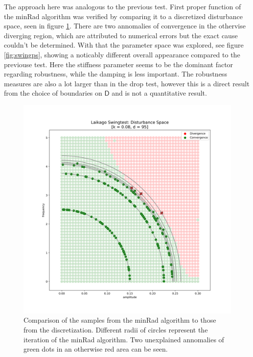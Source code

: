     The approach here was analogous to the previous test. First proper function of the minRad algorithm was verified by comparing it to a discretized disturbance space, seen in figure \ref{fig:swingoverlay}. There are two annomalies of convergence in the othervise diverging region, which are attributed to numerical errors but the exact cause couldn't be determined. With that the parameter space was explored, see figure \ref{fig:swingps}, showing a noticably different overall appearance compared to the previouse test. Here the stiffness parameter seems to be the dominant factor regarding robustness, while the damping is less important. The robustness measures are also a lot larger than in the drop test, however this is a direct result from the choice of boundaries on $\mathsf{D}$ and is not a quantitative result.   
    \begin{figure}[h]\label{fig:swingoverlay}
    \centering
    \includegraphics[width=.7\linewidth]{figures/swingtest_ds_overay_v3.png}
    \caption[Overlay of minRad and Discretized Disturbance Space, Swing Test]{Comparison of the samples from the minRad algorithm to those from the discretization. Different radii of circles represent the iteration of the minRad algorithm. Two unexplained annomalies of green dots in an otherwise red area can be seen.}
    \end{figure}    

